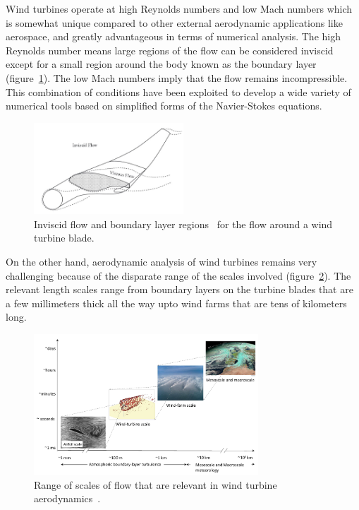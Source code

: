 Wind turbines operate at high Reynolds numbers and low Mach numbers which is somewhat unique compared to other external aerodynamic applications like aerospace, and greatly advantageous in terms of numerical analysis. The high Reynolds number means large regions of the flow can be considered inviscid except for a small region around the body known as the boundary layer (figure~\ref{fig:zonal}). The low Mach numbers imply that the flow remains incompressible. This combination of conditions have been exploited to develop a wide variety of numerical tools based on simplified forms of the Navier-Stokes equations.
\begin{figure}[h!]
\centering
\captionsetup{justification=centering}
 \includegraphics[width=0.5\textwidth]{ch1_introduction/images/zonal.png}
\caption{Inviscid flow and boundary layer regions~\cite{katz_plotkin_2001} for the flow around a wind turbine blade.}
 \label{fig:zonal}
\end{figure} 
On the other hand, aerodynamic analysis of wind turbines remains very challenging because of the disparate range of the scales involved (figure~\ref{fig:scales}). The relevant length scales range from boundary layers on the turbine blades that  are a few millimeters thick all the way upto wind farms that are tens of kilometers long. 
\begin{figure}[h!]
\centering
\captionsetup{justification=centering}
 \includegraphics[width=0.75\textwidth]{ch1_introduction/images/scales_porteagel.png}
\caption{Range of scales of flow that are relevant in wind turbine aerodynamics~\cite{porte2020wind}.}
 \label{fig:scales}
\end{figure} 

